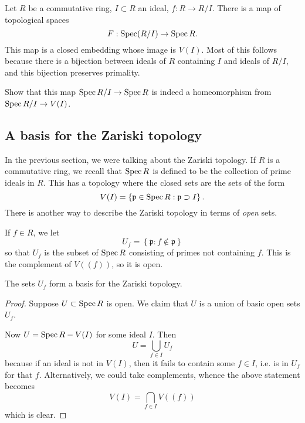 \begin{example} 
Let $R$ be a commutative ring, $I \subset R$ an ideal, $f: R \to
R/I$. There is a map
of topological spaces
\[ F: \operatorname{Spec} (R/I) \to \operatorname{Spec} R  .\]
This map is a closed embedding whose image is $V(I)$. Most of
this follows because
there is a bijection between ideals of $R$ containing $I$ and
ideals of $R/I$, and this bijection preserves primality.

\begin{exercise} 
Show that this map $\operatorname{Spec} R/I \to \operatorname{Spec} R$ is indeed a
homeomorphism from $\operatorname{Spec} R/I
\to V(I)$.  
\end{exercise} 
\end{example} 


\subsection{A basis for the Zariski topology}
In the previous section, we were talking about the Zariski
topology. If $R$ is a
commutative ring, we recall that $\operatorname{Spec} R$ is defined to be the
collection of
prime ideals in $R$. This has a topology where the closed sets
are the sets of
the form
\[ V(I) = \left\{\mathfrak{p} \in \operatorname{Spec} R: \mathfrak{p} \supset
I\right\} . \]
There is another way to describe the Zariski topology in terms
of
\emph{open} sets.  

\begin{definition} 
If $f \in R$, we let 
\[ U_f = \left\{\mathfrak{p}: f \notin \mathfrak{p}\right\}  \]
so that $U_f$ is the subset of $\operatorname{Spec} R$ consisting of primes
not containing
$f$. This is the complement of $V((f))$, so it is open.  
\end{definition} 

\begin{proposition} 
The sets $U_f$ form a basis for the Zariski topology. 
\end{proposition} 

\begin{proof} 
Suppose $U \subset \operatorname{Spec} R$ is open. We claim that $U$ is a
union of basic
open sets $U_f$. 

Now $U = \operatorname{Spec} R - V(I)$ for some ideal $I$.  Then
\[ U = \bigcup_{f \in I} U_f  \]
because if an ideal is not in $V(I)$, then it fails to contain
some $f \in I$,
i.e. is in $U_f$ for that $f$. Alternatively, we could take
complements, whence
the above statement becomes
\[ V(I) = \bigcap_{f \in I} V((f))  \]
which is clear.
\end{proof} 

